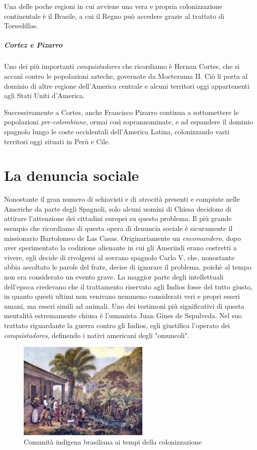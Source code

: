 \documentclass[11pt]{report}
\begin{document}
	Una delle poche regioni in cui avviene una vera e propria colonizzazione continentale è il Brasile, a cui il Regno può accedere grazie al trattato di Torsedillas.
	
	 \subparagraph*{Cortez e Pizarro} Uno dei più importanti \textit{conquistadores} che ricordiamo è Hernan Cortes, che si accanì contro le popolazioni azteche, governate da Moctezuma II. Ciò li porta al dominio di altre regione dell'America centrale e alcuni territori oggi appartenenti agli Stati Uniti d'America. 
	
	Successivamente a Cortes, anche Francisco Pizarro continua a sottomettere le popolazioni \textit{pre-colombiane}, ormai così soprannominate, e ad espandere il dominio spagnolo lungo le coste occidentali dell'America Latina, colonizzando vasti territori oggi situati in Perù e Cile.
	
	\section{La denuncia sociale}
	
	Nonostante il gran numero di schiavisti e di atrocità presenti e compiute nelle Americhe da parte degli Spagnoli, solo alcuni uomini di Chiesa decidono di attirare l'attenzione dei cittadini europei su questo problema. Il più grande esempio che ricordiamo di questa opera di denuncia sociale è sicuramente il missionario Bartolomeo de Las Casas. Originariamente un \textit{encomandero}, dopo aver sperimentato la codizione alienante in cui gli Amerindi erano costretti a vivere, egli decide di rivolgersi al sovrano spagnolo Carlo V, che, nonostante abbia ascoltato le parole del frate, decise di ignorare il problema, poichè al tempo non era considerato un evento grave. La maggior parte degli intellettuali dell'epoca credevano che il trattamento riservato agli Indios fosse del tutto giusto, in quanto questi ultimi non venivano nemmeno considerati veri e propri esseri umani, ma esseri simili ad animali. Uno dei testimoni più significativi di questa mentalità estremamente chiusa è l'umanista Juan Gines de Sepulveda. Nel suo trattato riguardante la guerra contro gli Indios, egli giustifica l'operato dei \textit{conquistadores}, definendo i nativi americani degli "omuncoli".\cite{milazzo2014democrate} \\
	
	\begin{figure}
		\includegraphics[width=2.5in]{"indios"}
		\caption{{\small Comunità indigena brasiliana ai tempi della colonizzazione}}
	\end{figure}
	
\end{document}
